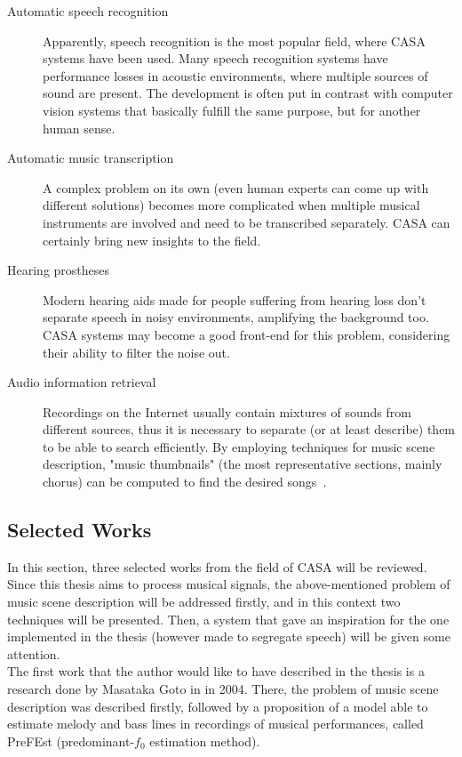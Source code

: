 \begin{description}
	\item[Automatic speech recognition] Apparently, speech recognition is the most popular field, where CASA systems have been used. Many speech recognition systems have performance losses in acoustic environments, where multiple sources of sound are present. The development is often put in contrast with computer vision systems that basically fulfill the same purpose, but for another human sense.
	\item[Automatic music transcription] A complex problem on its own (even human experts can come up with different solutions) becomes more complicated when multiple musical instruments are involved and need to be transcribed separately. CASA can certainly bring new insights to the field.
	\item[Hearing prostheses] Modern hearing aids made for people suffering from hearing loss don't separate speech in noisy environments, amplifying the background too. CASA systems may become a good front-end for this problem, considering their ability to filter the noise out.
	\item[Audio information retrieval] Recordings on the Internet usually contain mixtures of sounds from different sources, thus it is necessary to separate (or at least describe) them to be able to search efficiently. By employing techniques for music scene description, "music thumbnails" (the most representative sections, mainly chorus) can be computed to find the desired songs~\cite{Wang2006}.
\end{description}

\subsection{Selected Works}

In this section, three selected works from the field of CASA will be reviewed. Since this thesis aims to process musical signals, the above-mentioned problem of music scene description will be addressed firstly, and in this context two techniques will be presented. Then, a system that gave an inspiration for the one implemented in the thesis (however made to segregate speech) will be given some attention.\\

The first work that the author would like to have described in the thesis is a research done by Masataka Goto in \cite{Goto2004} in 2004. There, the problem of music scene description was described firstly, followed by a proposition of a model able to estimate melody and bass lines in recordings of musical performances, called PreFEst (predominant-$f_0$ estimation method).\\


